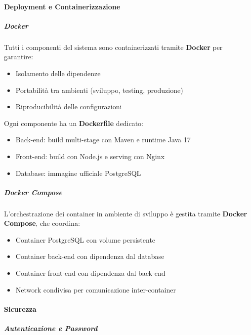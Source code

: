 \paragraph{Deployment e Containerizzazione}
\label{subsubsec:deployment}

\subparagraph{Docker}

Tutti i componenti del sistema sono containerizzati tramite \textbf{Docker} per garantire:
\begin{itemize}[leftmargin=1.1em]
\item Isolamento delle dipendenze
\item Portabilità tra ambienti (sviluppo, testing, produzione)
\item Riproducibilità delle configurazioni
\end{itemize}

Ogni componente ha un \textbf{Dockerfile} dedicato:
\begin{itemize}[leftmargin=1.1em]
\item Back-end: build multi-stage con Maven e runtime Java 17
\item Front-end: build con Node.js e serving con Nginx
\item Database: immagine ufficiale PostgreSQL
\end{itemize}

\subparagraph{Docker Compose}

L'orchestrazione dei container in ambiente di sviluppo è gestita tramite \textbf{Docker Compose}, che coordina:
\begin{itemize}[leftmargin=1.1em]
\item Container PostgreSQL con volume persistente
\item Container back-end con dipendenza dal database
\item Container front-end con dipendenza dal back-end
\item Network condivisa per comunicazione inter-container
\end{itemize}

\paragraph{Sicurezza}
\label{subsubsec:sicurezza-sistema}

\subparagraph{Autenticazione e Password}

